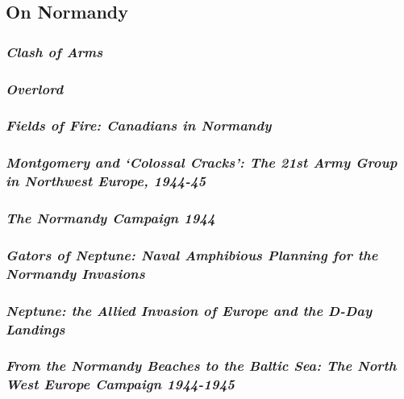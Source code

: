 \documentclass[noraggedright]{turabian-researchpaper}
\begin{document}
	\subsection{On Normandy}


		\subsubsection{\textit{Clash of Arms}}
		\subsubsection{\textit{Overlord}}
		\subsubsection{\textit{Fields of Fire:  Canadians in 
			Normandy}}

			
		\subsubsection{\textit{Montgomery and `Colossal Cracks':  
			The 21st Army Group in Northwest Europe, 1944-45}}
		\subsubsection{\textit{The Normandy Campaign 1944}}
		\subsubsection{\textit{Gators of Neptune: Naval Amphibious
			Planning for the Normandy Invasions}}
		\subsubsection{\textit{Neptune:  the Allied Invasion of 
			Europe and the D-Day Landings}}
		\subsubsection{\textit{From the Normandy Beaches to the 
			Baltic Sea: The North West Europe Campaign
			1944-1945}}
\end{document}
